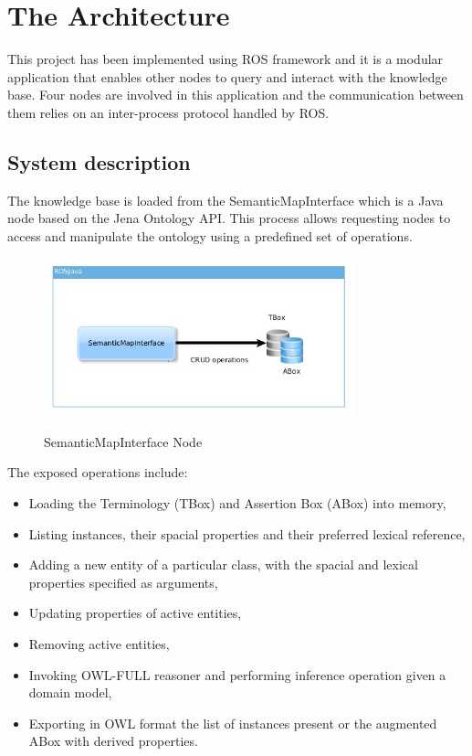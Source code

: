 \section{The Architecture}

This project has been implemented using ROS framework and it is a modular application that enables other nodes to query and interact with the knowledge base. Four nodes are involved in this application and the communication between them relies on an inter-process protocol handled by ROS.

\subsection{System description}

The knowledge base is loaded from the SemanticMapInterface which is a Java node based on the Jena Ontology API. This process allows requesting nodes to access and manipulate the ontology using a predefined set of operations.

\begin{figure}[H]
\centering
\includegraphics[width=0.8\textwidth]{imgs/semantic.jpg}
\label{fig:actions}
\caption{SemanticMapInterface Node}
\end{figure}

The exposed operations include:

\begin{itemize}
\item Loading the Terminology (TBox) and Assertion Box (ABox) into memory,
\item Listing instances, their spacial properties and their preferred lexical reference,
\item Adding a new entity of a particular class, with the spacial and lexical properties specified as arguments,
\item Updating properties of active entities,
\item Removing active entities,
\item Invoking OWL-FULL reasoner and performing inference operation given a domain model, 
\item Exporting in OWL format the list of instances present or the augmented ABox with derived properties.

\end{itemize}

